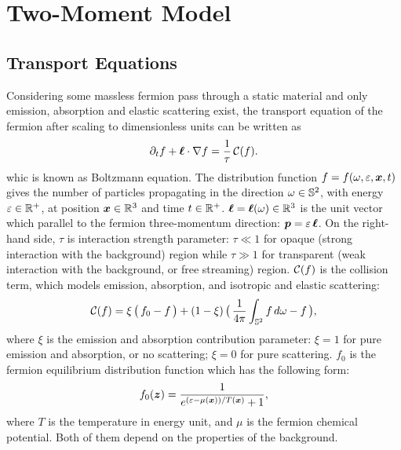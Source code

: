 \section{Two-Moment Model}\label{se:Two-MomentModel}

\subsection{Transport Equations}
Considering some massless fermion pass through a static material and only emission, absorption and elastic scattering exist, the transport equation of the fermion after scaling to dimensionless units can be written as
\begin{equation}
  \pd{f}{t}+\vect{\ell}\cdot\nabla f
  =\f{1}{\tau}\,\cC(f).
  \label{eq:boltzmann}
\end{equation}
whic is known as Boltzmann equation.
The distribution function $f = f(\omega,\varepsilon,\boldsymbol{x},t)$ gives the number of particles propagating in the direction $\omega\in\mathbb{S}^{2}$, with energy $\varepsilon\in\mathbb{R}^{+}$, at position $\boldsymbol{x}\in\mathbb{R}^{3}$ and time $t\in\mathbb{R}^{+}$.  
$\boldsymbol{\ell} = \boldsymbol{\ell}(\omega)\in\mathbb{R}^{3}$ is the unit vector which parallel to the fermion three-momentum direction: $\boldsymbol{p}=\varepsilon\,\boldsymbol{\ell}$.
On the right-hand side, $\tau$ is interaction strength parameter: $\tau\ll1$ for opaque (strong interaction with the background) region while $\tau\gg1$ for transparent (weak interaction with the background, or free streaming) region.
$\mathcal{C}(f)$ is the collision term, which models emission, absorption, and isotropic and elastic scattering: 
\begin{equation}
  \cC(f)=\xi\,\big(\,f_{0}-f\,\big)
  +(1-\xi)\,\big(\,\f{1}{4\pi}\int_{\bbS^{2}}f\,d\omega-f\,\big),
  \label{eq:collisionTerm}
\end{equation}
where $\xi$ is the emission and absorption contribution parameter: $\xi = 1$ for pure emission and absorption, or no scattering; $\xi = 0$ for pure scattering. 
$f_{0}$ is the fermion equilibrium distribution function which has the following form:
\begin{equation}
  f_{0}(\vect{z})=\f{1}{e^{(\varepsilon-\mu(\vect{x}))/T(\vect{x})}+1},  
  \label{eq:fermiDirac}
\end{equation}
where $T$ is the temperature in energy unit, and $\mu$ is the fermion chemical potential.
Both of them depend on the properties of the background.


